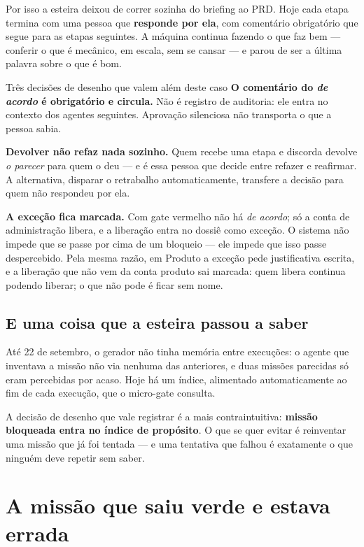 \documentclass[11pt,a4paper]{article}
\newcommand{\cod}[1]{{\ttfamily\small #1}}
\begin{document}
Por isso a esteira deixou de correr sozinha do briefing ao PRD. Hoje cada etapa termina com uma pessoa que \textbf{responde por ela}, com comentário obrigatório que segue para as etapas seguintes. A máquina continua fazendo o que faz bem --- conferir o que é mecânico, em escala, sem se cansar --- e parou de ser a última palavra sobre o que é bom.

\begin{caixaConceito}{Três decisões de desenho que valem além deste caso}
\textbf{O comentário do \emph{de acordo} é obrigatório e circula.} Não é registro de auditoria: ele entra no contexto dos agentes seguintes. Aprovação silenciosa não transporta o que a pessoa sabia.

\textbf{Devolver não refaz nada sozinho.} Quem recebe uma etapa e discorda devolve \emph{o parecer} para quem o deu --- e é essa pessoa que decide entre refazer e reafirmar. A alternativa, disparar o retrabalho automaticamente, transfere a decisão para quem não respondeu por ela.

\textbf{A exceção fica marcada.} Com gate vermelho não há \emph{de acordo}; só a conta de administração libera, e a liberação entra no dossiê como exceção. O sistema não impede que se passe por cima de um bloqueio --- ele impede que isso passe despercebido. Pela mesma razão, em Produto a exceção pede justificativa escrita, e a liberação que não vem da conta \cod{produto} sai marcada: quem libera continua podendo liberar; o que não pode é ficar sem nome.
\end{caixaConceito}

\subsection{E uma coisa que a esteira passou a saber}

Até 22 de setembro, o gerador não tinha memória entre execuções: o agente que inventava a missão não via nenhuma das anteriores, e duas missões parecidas só eram percebidas por acaso. Hoje há um índice, alimentado automaticamente ao fim de cada execução, que o micro-gate consulta.

A decisão de desenho que vale registrar é a mais contraintuitiva: \textbf{missão bloqueada entra no índice de propósito}. O que se quer evitar é reinventar uma missão que já foi tentada --- e uma tentativa que falhou é exatamente o que ninguém deve repetir sem saber.

\section{A missão que saiu verde e estava errada}
\label{sec:exp09}
\end{document}
